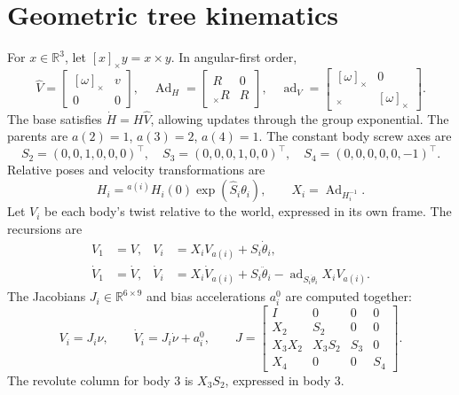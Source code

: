 \documentclass[11pt,a4paper]{article}
\DeclareMathOperator{\Ad}{Ad}\DeclareMathOperator{\ad}{ad}\DeclareMathOperator{\diag}{diag}
\newcommand{\R}{\mathbb R}\newcommand{\SE}{\mathrm{SE}(3)}
\newcommand{\sk}[1]{[#1]_\times}\newcommand{\E}{\mathsf E}\newcommand{\B}{\mathsf B}
\begin{document}
\section{Geometric tree kinematics}
For \(x\in\R^3\), let \(\sk{x}y=x\times y\). In angular-first order,
\begin{equation}
\widehat V=\begin{bmatrix}\sk{\omega}&v\\0&0\end{bmatrix},\quad
\Ad_H=\begin{bmatrix}R&0\\\sk{p}R&R\end{bmatrix},\quad
\ad_V=\begin{bmatrix}\sk{\omega}&0\\\sk{v}&\sk{\omega}\end{bmatrix}.
\end{equation}
The base satisfies \(\dot H=H\widehat V\), allowing updates through the
group exponential. The parents are \(a(2)=1\), \(a(3)=2\), \(a(4)=1\).
The constant body screw axes are
\begin{equation}
S_2=(0,0,1,0,0,0)^\top,\quad S_3=(0,0,0,1,0,0)^\top,\quad
S_4=(0,0,0,0,0,-1)^\top.
\end{equation}
Relative poses and velocity transformations are
\begin{equation}
H_i={}^{a(i)}H_i(0)\exp(\widehat S_i\theta_i),\qquad X_i=\Ad_{H_i^{-1}}.
\end{equation}
Let \(V_i\) be each body's twist relative to the world, expressed in its
own frame. The recursions are
\begin{align}
V_1&=V,& V_i&=X_iV_{a(i)}+S_i\dot\theta_i,\\
\dot V_1&=\dot V,&\dot V_i&=X_i\dot V_{a(i)}+S_i\ddot\theta_i
-\ad_{S_i\dot\theta_i}X_iV_{a(i)}.\label{eq:acc}
\end{align}
The Jacobians \(J_i\in\R^{6\times9}\) and bias accelerations \(a_i^0\)
are computed together:
\begin{equation}
V_i=J_i\nu,\qquad \dot V_i=J_i\dot\nu+a_i^0,\qquad
J=\begin{bmatrix}I&0&0&0\\X_2&S_2&0&0\\X_3X_2&X_3S_2&S_3&0\\X_4&0&0&S_4\end{bmatrix}.
\label{eq:J}
\end{equation}
The revolute column for body 3 is \(X_3S_2\), expressed in body 3.
\end{document}
